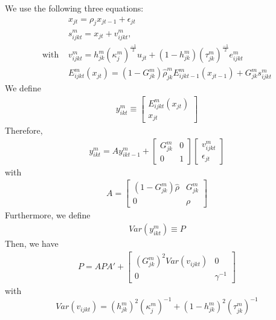We use the following three equations:
\begin{align*}
&	x_{jt} = \rho_j x_{jt-1} + \epsilon_{jt}\\
 & s_{ijkt}^m = x_{jt} + v_{ijkt}^m , \\
	\text{with } & v_{ijkt}^m = h_{jk}^m (\kappa_j^m)^{\frac{-1}{2} } u_{jt} + (1-h_{jk}^m ) (\tau_{jk}^m )^{\frac{-1}{2}} e_{ijkt}^m \\
	& 	E_{ijkt}^m(x_{jt})=(1-G_{jk}^m)\hat\rho_{jk}^mE_{ijkt-1}^m(x_{jt-1})+G_{jk}^ms_{ijkt}^m
\end{align*}
We define 
\begin{align*}
y_{ikt}^m \equiv	\begin{bmatrix}
		E_{ijkt}^m(x_{jt}) \\
		x_{jt}
	\end{bmatrix} 
\end{align*}
Therefore, 
\begin{align*}
	y_{ikt}^m = A y_{ikt-1}^m + \begin{bmatrix}
		G_{jk}^m & 0\\
		0 & 1
	\end{bmatrix}  \begin{bmatrix}
	v_{ijkt}^m \\
	\epsilon_{jt}
\end{bmatrix} 
\end{align*}
with 
\begin{align*}
	A =  \begin{bmatrix}
		(1-G_{jk}^m) \hat{\rho} & G_{jk}^m\\
		0 & \rho
	\end{bmatrix} 
\end{align*}
Furthermore, we define
\begin{align*}
	Var(y_{ikt}^m) \equiv  P
\end{align*}
Then, we have
\begin{align*}
		P = A P A' +  \begin{bmatrix}
		(G_{jk}^{m})^2 Var(v_{ijkt})& 0\\
		0 & \gamma^{-1}
	\end{bmatrix} 
\end{align*}
with 
$$ Var(v_{ijkt}) = (h_{jk}^m)^2 (\kappa_j^m)^{-1} + (1-h_{jk}^m)^2 (\tau_{jk}^m)^{-1}$$

